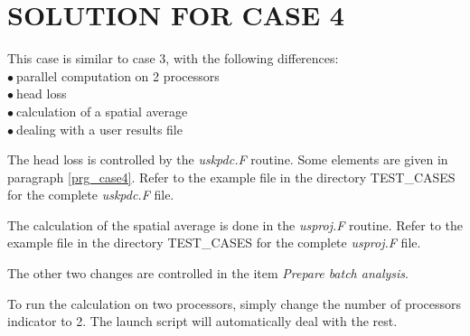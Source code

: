 %
%
%
%
%
%
%
\section{SOLUTION FOR CASE 4}
This case is similar to case 3, with the following differences:\\
\hspace*{1cm}$\bullet\ $parallel computation on 2 processors\\
\hspace*{1cm}$\bullet\ $head loss\\
\hspace*{1cm}$\bullet\ $calculation of a spatial average\\
\hspace*{1cm}$\bullet\ $dealing with a user results file

The head loss is controlled by the {\itshape uskpdc.F} routine. Some elements
are given in paragraph \ref{prg_case4}. Refer to the example file in the
directory TEST\_CASES for the complete {\itshape uskpdc.F} file.

The calculation of the spatial average is done in the {\itshape usproj.F}
routine. Refer to the example file in the
directory TEST\_CASES for the complete {\itshape usproj.F} file.

The other two changes are controlled in the item
{\itshape Prepare batch analysis}.

To run the calculation on two processors, simply change the number of processors
indicator to 2. The launch script will automatically deal with the rest.

